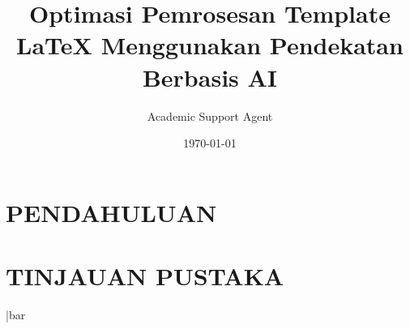 \documentclass{article}
\title{Optimasi Pemrosesan Template LaTeX Menggunakan Pendekatan Berbasis AI}
\author{Academic Support Agent}
\date{\today}
\begin{document}
\maketitle

\begin{abstract}

\end{abstract}

\chapter{PENDAHULUAN}


\chapter{TINJAUAN PUSTAKA}


\usepackage[a4paper, top=2cm,right=1cm,left=1cm,bottom=0.5cm]{geometry}
\usepackage{url}

\usepackage{ifthen}
\usepackage{xcolor}

\usepackage{multicol}
\setlength{\columnsep}{1cm}
\setlength{\columnseprule}{1pt}
\usepackage[compact]{titlesec}

\usepackage{mathtools}
\usepackage{siunitx}
\DeclareSIUnit\bar{bar}

\usepackage[version=4]{mhchem} 

\makeatletter
\newsavebox\myboxA
\newsavebox\myboxB
\newlength\mylenA
\newcommand*\overbar[2][0.75]{%
    \sbox{\myboxA}{$\m@th#2$}%
    \setbox\myboxB\null%
    \ht\myboxB=\ht\myboxA%
    \dp\myboxB=\dp\myboxA%
    \wd\myboxB=#1\wd\myboxA%
    \sbox\myboxB{$\m@th\overline{\copy\myboxB}$}%
    \setlength\mylenA{\the\wd\myboxA}%
    \addtolength\mylenA{-\the\wd\myboxB}%
    \ifdim\wd\myboxB<\wd\myboxA%
       \rlap{\hskip 0.5\mylenA\usebox\myboxB}{\usebox\myboxA}%
    \else
        \hskip -0.5\mylenA\rlap{\usebox\myboxA}{\hskip 0.5\mylenA\usebox\myboxB}%
    \fi}
\makeatother
\renewcommand{\arraystretch}{1.2}

\makeatletter
\renewcommand*\env@matrix[1][\arraystretch]{%
  \edef\arraystretch{#1}%
  \hskip -\arraycolsep
  \let\@ifnextchar\new@ifnextchar
  \array{*\c@MaxMatrixCols c}}
\makeatother

\usepackage{esint}
\usepackage{setspace}
\usepackage{colortbl}
\usepackage{xcolor}
\usepackage{enumitem}
\end{document}
